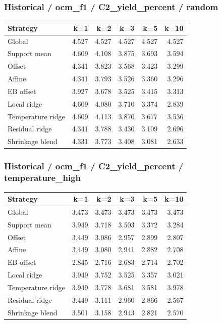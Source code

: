 \subsubsection*{Historical / ocm\_f1 / C2\_yield\_percent / random}
\begin{center}\small
\begin{tabular}{lrrrrr}
\toprule
Strategy & k=1 & k=2 & k=3 & k=5 & k=10 \\
\midrule
Global & 4.527 & 4.527 & 4.527 & 4.527 & 4.527 \\
Support mean & 4.609 & 4.108 & 3.875 & 3.693 & 3.594 \\
Offset & 4.341 & 3.823 & 3.568 & 3.423 & 3.299 \\
Affine & 4.341 & 3.793 & 3.526 & 3.360 & 3.296 \\
EB offset & 3.927 & 3.678 & 3.525 & 3.415 & 3.313 \\
Local ridge & 4.609 & 4.080 & 3.710 & 3.374 & 2.839 \\
Temperature ridge & 4.609 & 4.113 & 3.870 & 3.677 & 3.536 \\
Residual ridge & 4.341 & 3.788 & 3.430 & 3.109 & 2.696 \\
Shrinkage blend & 4.331 & 3.773 & 3.408 & 3.081 & 2.633 \\
\bottomrule
\end{tabular}
\end{center}

\subsubsection*{Historical / ocm\_f1 / C2\_yield\_percent / temperature\_high}
\begin{center}\small
\begin{tabular}{lrrrrr}
\toprule
Strategy & k=1 & k=2 & k=3 & k=5 & k=10 \\
\midrule
Global & 3.473 & 3.473 & 3.473 & 3.473 & 3.473 \\
Support mean & 3.949 & 3.718 & 3.503 & 3.372 & 3.284 \\
Offset & 3.449 & 3.086 & 2.957 & 2.899 & 2.807 \\
Affine & 3.449 & 3.080 & 2.941 & 2.882 & 2.708 \\
EB offset & 2.845 & 2.716 & 2.683 & 2.714 & 2.702 \\
Local ridge & 3.949 & 3.752 & 3.525 & 3.357 & 3.021 \\
Temperature ridge & 3.949 & 3.778 & 3.681 & 3.581 & 3.978 \\
Residual ridge & 3.449 & 3.111 & 2.960 & 2.866 & 2.567 \\
Shrinkage blend & 3.501 & 3.158 & 2.943 & 2.821 & 2.570 \\
\bottomrule
\end{tabular}
\end{center}

